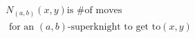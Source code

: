 \documentclass[preview]{standalone}
\begin{document}
\begin{align*}
{N_{(a,b)}(x,y)} \text{is } \# \text{of moves} \\ \text{ for an }(a,b)\text{-superknight to get to} (x,y)
\end{align*}
\end{document}
